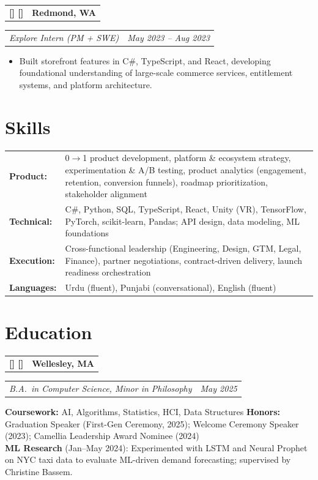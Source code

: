 \documentclass[11pt]{article}
\makeatletter
\newcommand{\FirstBig}[1]{%
  \StrLeft{#1}{1}[\FirstChar]%
  \StrGobbleLeft{#1}{1}[\RestChars]%
  {\large\bfseries\FirstChar}\RestChars%
}
\newcommand{\twocol}[2]{%
  \begin{tabularx}{\linewidth}{@{}X r@{}}
    \textbf{\FirstBig{#1}} & \textbf{#2} \\
  \end{tabularx}
}
\newcommand{\roleline}[2]{%
  \begin{tabularx}{\linewidth}{@{}X r@{}}
    \textit{#1} & \textit{#2} \\
  \end{tabularx}
}
\makeatother
\begin{document}
\twocol{Microsoft --- Xbox}{Redmond, WA}
\roleline{Explore Intern (PM + SWE)}{May 2023 -- Aug 2023}
\begin{itemize}
  \item Built storefront features in C\#, TypeScript, and React, developing foundational understanding of large-scale commerce services, entitlement systems, and platform architecture.
\end{itemize}

\section{Skills}

\begin{tabularx}{\linewidth}{@{} >{\bfseries}l X @{}}
  Product:       & 0$\to$1 product development, platform \& ecosystem strategy, experimentation \& A/B testing, product analytics (engagement, retention, conversion funnels), roadmap prioritization, stakeholder alignment \\[3pt]
  Technical:     & C\#, Python, SQL, TypeScript, React, Unity (VR), TensorFlow, PyTorch, scikit-learn, Pandas; API design, data modeling, ML foundations \\[3pt]
  Execution:     & Cross-functional leadership (Engineering, Design, GTM, Legal, Finance), partner negotiations, contract-driven delivery, launch readiness orchestration \\[3pt]
  Languages:     & Urdu (fluent), Punjabi (conversational), English (fluent) \\
\end{tabularx}

\section{Education}

\twocol{Wellesley College}{Wellesley, MA}
\roleline{B.A.\ in Computer Science, Minor in Philosophy}{May 2025}
\vspace{1pt}
\textbf{Coursework:} AI, Algorithms, Statistics, HCI, Data Structures \quad
\textbf{Honors:} Graduation Speaker (First-Gen Ceremony, 2025); Welcome Ceremony Speaker (2023); Camellia Leadership Award Nominee (2024) \\[2pt]
\textbf{ML Research} (Jan--May 2024): Experimented with LSTM and Neural Prophet on NYC taxi data to evaluate ML-driven demand forecasting; supervised by Christine Bassem.

\end{document}
